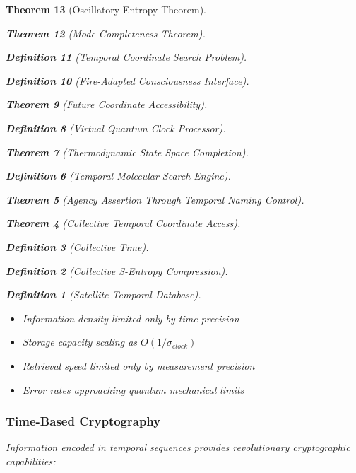 \documentclass[12pt,a4paper]{article}
\newtheorem{theorem}{Theorem}[section]
\newtheorem{definition}[theorem]{Definition}
\begin{document}
\begin{theorem}[Oscillatory Entropy Theorem]
\begin{theorem}[Mode Completeness Theorem]
\begin{enumerate}
\begin{definition}[Temporal Coordinate Search Problem]
\begin{algorithm}
\begin{definition}[Fire-Adapted Consciousness Interface]
\begin{theorem}[Future Coordinate Accessibility]
\begin{definition}[Virtual Quantum Clock Processor]
\begin{itemize}
\begin{itemize}
\begin{theorem}[Thermodynamic State Space Completion]
\begin{definition}[Temporal-Molecular Search Engine]
\begin{theorem}[Agency Assertion Through Temporal Naming Control]
\begin{remark}
\begin{theorem}[Collective Temporal Coordinate Access]
\begin{definition}[Collective Time]
\begin{definition}[Collective S-Entropy Compression]
\begin{definition}[Satellite Temporal Database]
\begin{algorithm}
\begin{table}[h]
{{\begin{itemize}
\item Information density limited only by time precision
\item Storage capacity scaling as $O(1/\sigma_{clock})$
\item Retrieval speed limited only by measurement precision
\item Error rates approaching quantum mechanical limits
\end{itemize}

\subsubsection{Time-Based Cryptography}

Information encoded in temporal sequences provides revolutionary cryptographic capabilities:

\begin{figure}[H]
\centering
{}
\end{figure}}}
\end{table}
\end{algorithm}
\end{definition}
\end{definition}
\end{definition}
\end{theorem}
\end{remark}
\end{theorem}
\end{definition}
\end{theorem}
\end{itemize}
\end{itemize}
\end{definition}
\end{theorem}
\end{definition}
\end{algorithm}
\end{definition}
\end{enumerate}
\end{theorem}
\end{theorem}
\end{document}
